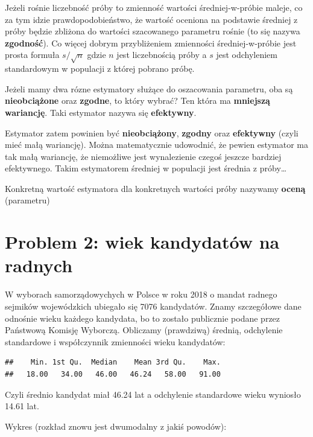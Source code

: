 \documentclass[
  openany]{book}
\begin{document}
Jeżeli rośnie liczebność próby to zmienność wartości średniej-w-próbie maleje, co za tym
idzie prawdopodobieństwo, że wartość oceniona na podstawie
średniej z próby będzie zbliżona do wartości szacowanego parametru rośnie (to się nazywa \textbf{zgodność}).
Co więcej dobrym przybliżeniem zmienności średniej-w-próbie
jest prosta formuła \(s/\sqrt{n}\) gdzie \(n\) jest liczebnością próby a \(s\) jest odchyleniem
standardowym w populacji z której pobrano próbę.

Jeżeli mamy dwa rózne estymatory służące do oszacowania parametru,
oba są \textbf{nieobciążone} oraz \textbf{zgodne}, to który wybrać?
Ten która ma \textbf{mniejszą wariancję}. Taki estymator nazywa się \textbf{efektywny}.

Estymator zatem powinien być \textbf{nieobciążony}, \textbf{zgodny} oraz \textbf{efektywny} (czyli mieć
małą wariancję). Można matematycznie udowodnić, że pewien estymator ma tak małą wariancję, że
niemożliwe jest wynalezienie czegoś jeszcze bardziej efektywnego. Takim estymatorem
średniej w populacji jest średnia z próby\ldots{}

Konkretną wartość estymatora dla konkretnych wartości próby nazywamy \textbf{oceną}
(parametru)

\hypertarget{problem-2-wiek-kandydatuxf3w-na-radnych}{%
\section{Problem 2: wiek kandydatów na radnych}\label{problem-2-wiek-kandydatuxf3w-na-radnych}}

W wyborach samorządowychych w Polsce w roku 2018 o mandat radnego
sejmików wojewódzkich ubiegało się 7076 kandydatów.
Znamy szczegółowe dane odnośnie wieku każdego kandydata,
bo to zostało publicznie podane przez Państwową Komisję Wyborczą.
Obliczamy (prawdziwą) średnią, odchylenie standardowe
i współczynnik zmienności wieku kandydatów:

\begin{verbatim}
##    Min. 1st Qu.  Median    Mean 3rd Qu.    Max. 
##   18.00   34.00   46.00   46.24   58.00   91.00
\end{verbatim}

Czyli średnio kandydat miał 46.24 lat
a odchylenie standardowe wieku wyniosło 14.61 lat.

Wykres (rozkład znowu jest dwumodalny z jakiś powodów):
\end{document}
